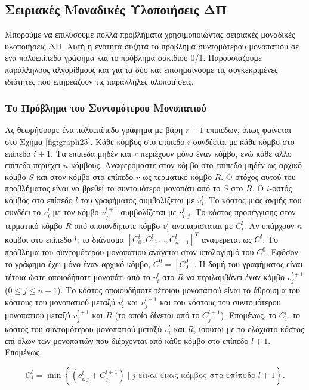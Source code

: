 \documentclass[12pt,a4paper]{article}
\begin{document}
\subsection{Σειριακές Μοναδικές Υλοποιήσεις ΔΠ}
Μπορούμε να επιλύσουμε πολλά προβλήματα χρησιμοποιώντας σειριακές
μοναδικές υλοποιήσεις ΔΠ. Αυτή η ενότητα συζητά το πρόβλημα
συντομότερου μονοπατιού σε ένα πολυεπίπεδο γράφημα και το πρόβλημα
σακιδίου 0/1. Παρουσιάζουμε παράλληλους αλγορίθμους και για τα δύο
και επισημαίνουμε τις συγκεκριμένες ιδιότητες που επηρεάζουν τις
παράλληλες υλοποιήσεις.

\subsubsection{Το Πρόβλημα του Συντομότερου Μονοπατιού}

Ας θεωρήσουμε ένα πολυεπίπεδο γράφημα με βάρη $r + 1$ επιπέδων,
όπως φαίνεται στο Σχήμα \ref{fig:graph25}. Κάθε κόμβος στο επίπεδο $i$ συνδέεται
με κάθε κόμβο στο επίπεδο $i + 1$. Τα επίπεδα μηδέν και $r$ περιέχουν
μόνο έναν κόμβο, ενώ κάθε άλλο επίπεδο περιέχει $n$ κόμβους.
Αναφερόμαστε στον κόμβο στο επίπεδο μηδέν ως αρχικό κόμβο $S$ και
στον κόμβο στο επίπεδο $r$ ως τερματικό κόμβο $R$. Ο στόχος αυτού
του προβλήματος είναι να βρεθεί το συντομότερο μονοπάτι από το $S$
στο $R$. Ο $i$-οστός κόμβος στο επίπεδο $l$ του γραφήματος συμβολίζεται
με $v_i^l$. Το κόστος μιας ακμής που συνδέει το $v_i^l$ με τον κόμβο
$v_j^{l+1}$ συμβολίζεται με $c_{i,j}^l$. Το κόστος προσέγγισης στον
τερματικό κόμβο $R$ από οποιονδήποτε κόμβο $v_i^l$ αναπαρίσταται με
$C_i^l$. Αν υπάρχουν $n$ κόμβοι στο επίπεδο $l$, το διάνυσμα
$[C_0^l, C_1^l, \ldots, C_{n-1}^l]^T$ αναφέρεται ως $C^l$. Το
πρόβλημα του συντομότερου μονοπατιού ανάγεται στον υπολογισμό του $C^0$.
Εφόσον το γράφημα έχει μόνο έναν αρχικό κόμβο, $C^0 = [C_0^0]$. Η
δομή του γραφήματος είναι τέτοια ώστε οποιοδήποτε μονοπάτι από το $v_i^l$
στο $R$ να περιλαμβάνει έναν κόμβο $v_j^{l+1}$ ($0 \leq j \leq n-1$).
Το κόστος οποιουδήποτε τέτοιου μονοπατιού είναι το άθροισμα του
κόστους του μονοπατιού μεταξύ $v_i^l$ και $v_j^{l+1}$ και του κόστους
του συντομότερου μονοπατιού μεταξύ $v_j^{l+1}$ και $R$ (το οποίο
δίνεται από το $C_j^{l+1}$). Επομένως, το $C_i^l$, το κόστος του
συντομότερου μονοπατιού μεταξύ $v_i^l$ και $R$, ισούται με το
ελάχιστο κόστος επί όλων των μονοπατιών που διέρχονται από κάθε
κόμβο στο επίπεδο $l + 1$. Επομένως,

\begin{equation}
C_i^l = \min \left\{ (c_{i,j}^l + C_j^{l+1}) \mid j \text{ είναι ένας κόμβος στο επίπεδο } l + 1 \right\}.
\label{eq:relation13}
\end{equation}
\end{document}
